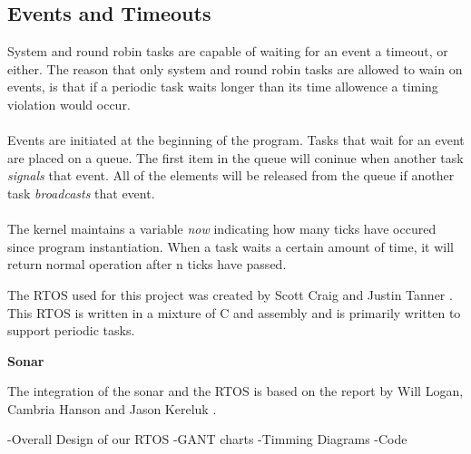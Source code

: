 \subsection{Events and Timeouts}

System and round robin tasks are capable of waiting for an event a timeout, or
either. The reason that only system and round robin tasks are allowed to wain on events, is that if a periodic task waits longer than its time allowence a timing violation would occur. \\

\\
Events are initiated at the beginning of the program. Tasks that wait for an event are placed on a queue. The first item in the queue will coninue when another task \textit{signals} that event. All of the elements will be released from the queue if another task \textit{broadcasts} that event. \\

\\
The kernel maintains a variable \textit{now} indicating how many ticks have occured since program instantiation. When a task waits a certain amount of time, it will return normal operation after n ticks have passed.





The RTOS used for this project was created by Scott Craig and Justin Tanner \cite{RTOSSJ}. This RTOS is written in a mixture of C and assembly and is primarily written to support periodic tasks.   




\noindent\textbf{Sonar}

The integration of the sonar and the RTOS is based on the report by Will
Logan, Cambria Hanson and Jason Kereluk \cite{autoB}.




-Overall Design of our RTOS
-GANT charts
-Timming Diagrams
-Code
